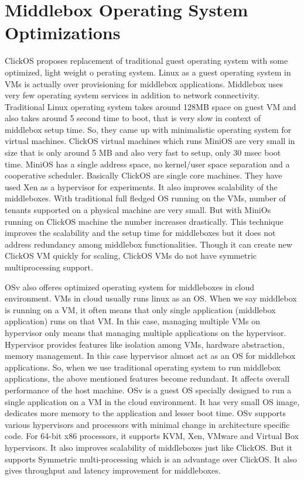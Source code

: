 \documentclass[a4paper,11pt]{report}
\begin{document}
\section{Middlebox Operating System Optimizations}

ClickOS\cite{179771} proposes replacement of traditional guest operating system with some optimized, light weight o	perating system. Linux as a guest operating system in VMs is actually over provisioning for middlebox applications. Middlebox uses very few operating system services in addition to network connectivity. Traditional Linux operating system takes around 128MB space on guest VM and also takes around 5 second time to boot, that is very slow in context of middlebox setup time. So, they came up with minimalistic operating system for virtual machines. ClickOS virtual machines which runs MiniOS are very small in size that is only around 5 MB and also very fast to setup, only 30 msec boot time. MiniOS has a single address space, no kernel/user space separation and a cooperative scheduler. Basically ClickOS are single core machines. They have used Xen as a hypervisor for experiments. It also improves scalability of the middleboxes. With traditional full fledged OS running on the VMs, number of tenants supported on a physical machine are very small. But with MiniOs running on ClickOS machine the number increases drastically. This technique improves the scalability and the setup time for middleboxes but it does not address redundancy among middlebox functionalities. Though it can create new ClickOS VM quickly for scaling, ClickOS VMs do not have symmetric multiprocessing support.             

OSv\cite{184011} also offeres optimized operating system for middleboxes in cloud environment. VMs in cloud usually runs linux as an OS. When we say middlebox is running on a VM, it often means that only single application (middlebox application) runs on that VM. In this case, managing multiple VMs on hypervisor only means that managing multiple applications on the hypervisor. Hypervisor provides features like isolation among VMs, hardware abstraction, memory management. In this case hypervisor almost act as an OS for middlebox applications. So, when we use traditional operating system to run middlebox applications, the above mentioned features become redundant. It affects overall performance of the host machine. OSv is a guest OS specially designed to run a single application on a VM in the cloud environment. It has very small OS image, dedicates more memory to the application and lesser boot time. OSv supports various hypervisors and processors with minimal change in architecture specific code. For 64-bit x86 processors, it supports KVM, Xen, VMware and Virtual Box hypervisors. It also improves scalability of middleboxes just like ClickOS. But it supports Symmetric multi-processing which is an advantage over ClickOS. It also gives throughput and latency improvement for middleboxes.
\end{document}
